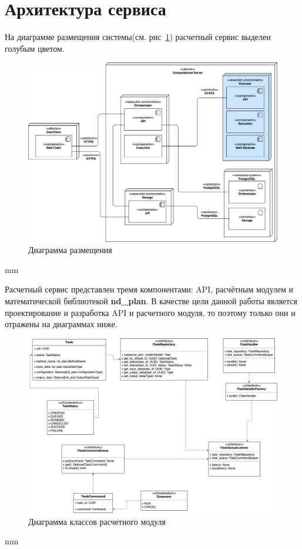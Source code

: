 \section*{\large{Архитектура сервиса}}

На диаграмме размещения системы(см. рис\ \ref{pic:architecture__deployment-diagram}) расчетный сервис выделен голубым цветом.

\begin{figure}[H]
	\hspace*{-1 cm}\includegraphics[width=\textwidth]{images/architecture/deployment_diagram}
	\caption{Диаграмма размещения}
	\label{pic:architecture__deployment-diagram}
\end{figure}
 mm

Расчетный сервис представлен тремя компонентами: API, расчётным модулем и математической библиотекой \textbf{nd\_plan}.
В качестве цели данной работы является проектирование и разработка API и расчетного модуля,
то поэтому только они и отражены на диаграммах ниже.

\begin{figure}[H]
	\hspace*{-2.5 cm}\includegraphics[width=1.2\textwidth]{images/architecture/execution_classes_diagram}
	\caption{Диаграмма классов расчетного модуля}
	\label{pic:architecture__execution-classes-diagram}
\end{figure}
 mm

